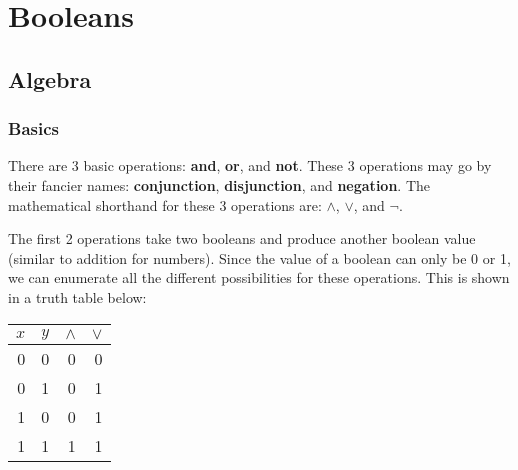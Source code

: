\documentclass[12pt]{book}
\begin{document}
  \begin{titlepage}
  \end{titlepage}

  \tableofcontents

  

  \chapter{Booleans}

  \section{Algebra}

  \subsection{Basics}

  There are 3 basic operations: \textbf{and}, \textbf{or}, and \textbf{not}.
  These 3 operations may go by their fancier names: \textbf{conjunction},
  \textbf{disjunction}, and \textbf{negation}. The mathematical shorthand for
  these 3 operations are: $\land$, $\lor$, and $\lnot$.

  The first 2 operations take two booleans and produce another boolean value
  (similar to addition for numbers). Since the value of a boolean can only be
  0 or 1, we can enumerate all the different possibilities for these operations.
  This is shown in a truth table below:

  \begin{center}
    \begin{tabular}{r r | r | r}
      $x$ & $y$ & $\land$ & $\lor$ \\
      \hline
        0 &   0 &       0 &      0 \\
        0 &   1 &       0 &      1 \\
        1 &   0 &       0 &      1 \\
        1 &   1 &       1 &      1 \\
    \end{tabular}
  \end{center}
\end{document}
